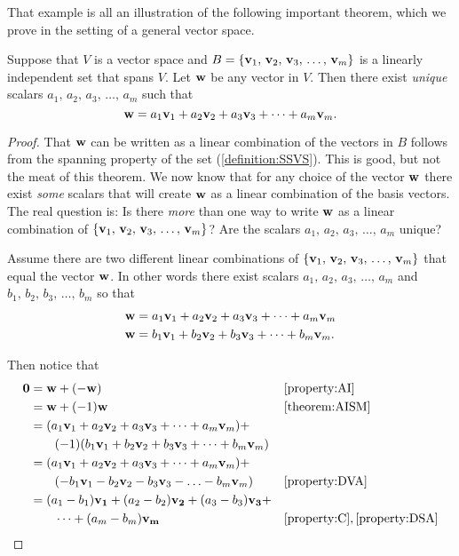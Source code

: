 \documentclass{ximera}
\begin{document}
That example is all an illustration of the following important
theorem, which we prove in the setting of a general vector space.

\begin{theorem}
  \label{theorem:VRRB}

  Suppose that $V$ is a vector space and $B=\left\{\mathbf{v}_{1},\,\mathbf{v}_{2},\,\mathbf{v}_{3},\,\ldots,\,\mathbf{v}_{m}\right\}$
  is a linearly independent set that spans $V$.  Let $\mathbf{w}$ be any
  vector in $V$.  Then there exist \textit{unique} scalars
  $a_1,\,a_2,\,a_3,\,\ldots,\,a_m$ such that
  \[
    \mathbf{w}=a_{1}\mathbf{v}_{1}+a_{2}\mathbf{v}_{2}+a_{3}\mathbf{v}_{3}+\cdots +a_{m}\mathbf{v}_{m}.
  \]

  \begin{proof}
    That $\mathbf{w}$ can be written as a linear combination of the
    vectors in $B$ follows from the spanning property of the set
    (\ref{definition:SSVS}).  This is good, but not the meat of this
    theorem.  We now know that for any choice of the vector $\mathbf{w}$
    there exist \textit{some} scalars that will create $\mathbf{w}$ as a
    linear combination of the basis vectors.  The real question is: Is
    there \textit{more} than one way to write $\mathbf{w}$ as a linear
    combination of $\{\mathbf{v}_{1},\,\mathbf{v}_{2},\,\mathbf{v}_{3},\,\ldots,\,\mathbf{v}_{m}\}$?  Are the scalars
    $a_1,\,a_2,\,a_3,\,\ldots,\,a_m$ unique?

    Assume there are two different linear combinations of
    $\{\mathbf{v}_{1},\,\mathbf{v}_{2},\,\mathbf{v}_{3},\,\ldots,\,\mathbf{v}_{m}\}$ that equal the vector $\mathbf{w}$.  In
    other words there exist scalars $a_1,\,a_2,\,a_3,\,\ldots,\,a_m$
    and $b_1,\,b_2,\,b_3,\,\ldots,\,b_m$ so that
    \begin{align*}
      \mathbf{w}&=a_{1}\mathbf{v}_{1}+a_{2}\mathbf{v}_{2}+a_{3}\mathbf{v}_{3}+\cdots +a_{m}\mathbf{v}_{m}\\
      \mathbf{w}&=b_{1}\mathbf{v}_{1}+b_{2}\mathbf{v}_{2}+b_{3}\mathbf{v}_{3}+\cdots +b_{m}\mathbf{v}_{m}.
    \end{align*}

    Then notice that
    \begin{align*}
      \mathbf{0}
      &=\mathbf{w}+(\mathbf{-w})&&\ref{property:AI}\\
      &=\mathbf{w}+(-1)\mathbf{w}&&\ref{theorem:AISM}\\
      &=(a_{1}\mathbf{v}_{1}+a_{2}\mathbf{v}_{2}+a_{3}\mathbf{v}_{3}+\cdots +a_{m}\mathbf{v}_{m})+\\
      &\quad\quad(-1)(b_{1}\mathbf{v}_{1}+b_{2}\mathbf{v}_{2}+b_{3}\mathbf{v}_{3}+\cdots +b_{m}\mathbf{v}_{m})\\
      &=(a_{1}\mathbf{v}_{1}+a_{2}\mathbf{v}_{2}+a_{3}\mathbf{v}_{3}+\cdots +a_{m}\mathbf{v}_{m})+\\
      &\quad\quad (-b_1\mathbf{v}_1-b_2\mathbf{v}_2-b_3\mathbf{v}_3-\ldots-b_m\mathbf{v}_m)&&\ref{property:DVA}\\
      &=(a_1-b_1)\mathbf{v_1}+(a_2-b_2)\mathbf{v_2}+(a_3-b_3)\mathbf{v_3}+\\
      &\quad\quad\cdots+(a_m-b_m)\mathbf{v_m}&&\ref{property:C}, \ref{property:DSA}
    \end{align*}


\end{proof}
\end{theorem}
\end{document}
